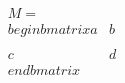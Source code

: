 \documentclass[preview]{standalone}
\begin{document}
\begin{align*}
M = \\begin{bmatrix} a & b \\\\ c & d \\end{bmatrix}
\end{align*}
\end{document}
